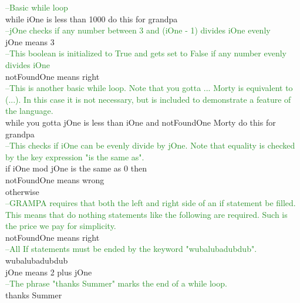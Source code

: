 \documentclass[numbers]{sigplanconf}
\begin{document}
{\textcolor{ForestGreen}{  --Basic while loop} \\
\indent while iOne is less than 1000 do this for grandpa \\

\textcolor{ForestGreen}{    --jOne checks if any number between 3 and (iOne - 1) divides iOne evenly} \\
\indent \indent jOne means 3 \\

\textcolor{ForestGreen}{    --This boolean is initialized to True and gets set to False if any number evenly divides iOne} \\
\indent \indent notFoundOne means right \\

\textcolor{ForestGreen}{    --This is another basic while loop. Note that you gotta ... Morty is equivalent to (...). In this case it is not necessary, but is included to demonstrate a feature of the language.} \\
\indent \indent while you gotta jOne is less than iOne and notFoundOne Morty do this for grandpa \\

\textcolor{ForestGreen}{      --This checks if iOne can be evenly divide by jOne. Note that equality is checked by the key expression "is the same as".} \\
\indent \indent \indent if iOne mod jOne is the same as 0 then \\
\indent \indent \indent \indent notFoundOne means wrong \\
\indent \indent \indent otherwise \\
\textcolor{ForestGreen}{        --GRAMPA requires that both the left and right side of an if statement be filled. This means that do nothing statements like the following are required. Such is the price we pay for simplicity.} \\
\indent \indent \indent \indent notFoundOne means right \\
\textcolor{ForestGreen}{      --All If statements must be ended by the keyword "wubalubadubdub".} \\
\indent \indent \indent wubalubadubdub \\

\indent \indent \indent \noindent jOne means 2 plus jOne \\

\textcolor{ForestGreen}{    --The phrase "thanks Summer" marks the end of a while loop.} \\
\indent \indent thanks Summer \\

}
\end{document}
